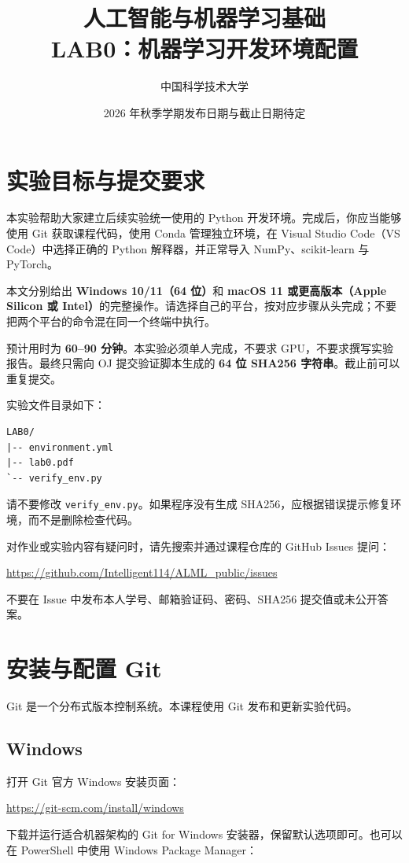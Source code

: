 \documentclass[11pt,a4paper]{article}
\title{\vspace{-1.35cm}\textbf{人工智能与机器学习基础\\LAB0：机器学习开发环境配置}}
\author{中国科学技术大学}
\date{2026 年秋季学期\quad 发布日期与截止日期待定}
\newcommand{\windows}{\subsection*{\textcolor{windowsblue}{Windows}}}
\begin{document}
\maketitle
\pagestyle{fancy}
\thispagestyle{fancy}

\section*{实验目标与提交要求}

本实验帮助大家建立后续实验统一使用的 Python 开发环境。完成后，你应当能够使用 Git 获取课程代码，使用 Conda 管理独立环境，在 Visual Studio Code（VS Code）中选择正确的 Python 解释器，并正常导入 NumPy、scikit-learn 与 PyTorch。

本文分别给出 \textbf{Windows 10/11（64 位）}和 \textbf{macOS 11 或更高版本（Apple Silicon 或 Intel）}的完整操作。请选择自己的平台，按对应步骤从头完成；不要把两个平台的命令混在同一个终端中执行。

\begin{importantbox}
预计用时为 \textbf{60--90 分钟}。本实验必须单人完成，不要求 GPU，不要求撰写实验报告。最终只需向 OJ 提交验证脚本生成的 \textbf{64 位 SHA256 字符串}。截止前可以重复提交。
\end{importantbox}

实验文件目录如下：

\begin{lstlisting}
LAB0/
|-- environment.yml
|-- lab0.pdf
`-- verify_env.py
\end{lstlisting}

请不要修改 \texttt{verify\_env.py}。如果程序没有生成 SHA256，应根据错误提示修复环境，而不是删除检查代码。

对作业或实验内容有疑问时，请先搜索并通过课程仓库的 GitHub Issues 提问：
\begin{center}
  \url{https://github.com/Intelligent114/ALML_public/issues}
\end{center}
不要在 Issue 中发布本人学号、邮箱验证码、密码、SHA256 提交值或未公开答案。

\section{安装与配置 Git}

Git 是一个分布式版本控制系统。本课程使用 Git 发布和更新实验代码。

\windows

打开 Git 官方 Windows 安装页面：
\begin{center}
  \url{https://git-scm.com/install/windows}
\end{center}
下载并运行适合机器架构的 Git for Windows 安装器，保留默认选项即可。也可以在 PowerShell 中使用 Windows Package Manager：
\end{document}
